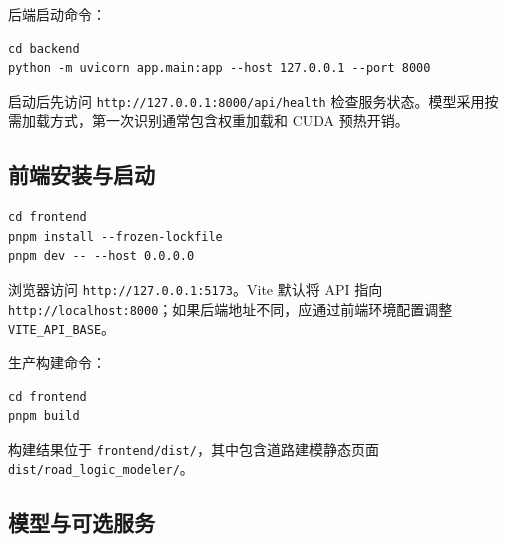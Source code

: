 后端启动命令：

\begin{Verbatim}[breaklines=true,breakanywhere=true,fontsize=\small,frame=single,framesep=2mm,rulecolor=\color{STransLine}]
cd backend
python -m uvicorn app.main:app --host 127.0.0.1 --port 8000
\end{Verbatim}

启动后先访问 \texttt{http:\allowbreak{}/\allowbreak{}/\allowbreak{}127.\allowbreak{}0.\allowbreak{}0.\allowbreak{}1:\allowbreak{}8000/\allowbreak{}api/\allowbreak{}health} 检查服务状态。模型采用按需加载方式，第一次识别通常包含权重加载和 CUDA 预热开销。

\subsection{前端安装与启动}\label{manual-ux524dux7aefux5b89ux88c5ux4e0eux542fux52a8}

\begin{Verbatim}[breaklines=true,breakanywhere=true,fontsize=\small,frame=single,framesep=2mm,rulecolor=\color{STransLine}]
cd frontend
pnpm install --frozen-lockfile
pnpm dev -- --host 0.0.0.0
\end{Verbatim}

浏览器访问 \texttt{http:\allowbreak{}/\allowbreak{}/\allowbreak{}127.\allowbreak{}0.\allowbreak{}0.\allowbreak{}1:\allowbreak{}5173}。Vite 默认将 API 指向 \texttt{http:\allowbreak{}/\allowbreak{}/\allowbreak{}localhost:\allowbreak{}8000}；如果后端地址不同，应通过前端环境配置调整 \texttt{V\allowbreak{}I\allowbreak{}T\allowbreak{}E\_\allowbreak{}\allowbreak{}A\allowbreak{}P\allowbreak{}I\_\allowbreak{}\allowbreak{}B\allowbreak{}A\allowbreak{}S\allowbreak{}E}。

生产构建命令：

\begin{Verbatim}[breaklines=true,breakanywhere=true,fontsize=\small,frame=single,framesep=2mm,rulecolor=\color{STransLine}]
cd frontend
pnpm build
\end{Verbatim}

构建结果位于 \texttt{frontend/\allowbreak{}dist/\allowbreak{}}，其中包含道路建模静态页面 \texttt{dist/\allowbreak{}road\_\allowbreak{}logic\_\allowbreak{}modeler/\allowbreak{}}。

\subsection{模型与可选服务}\label{manual-ux6a21ux578bux4e0eux53efux9009ux670dux52a1}

